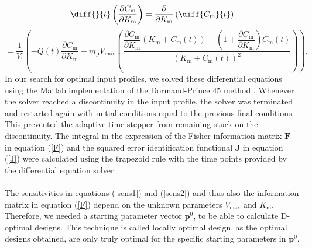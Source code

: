 \begin{equation}
\diff{}{t}\left(\dfrac{\partial C_\text{m}}{\partial K_{\text{m}}}\right) = 
\dfrac{\partial}{\partial K_{\text{m}}}\left(\diff{C_\text{m}}{t}\right)
\label{sens2}
\end{equation}
\begin{equation*}
=
\frac{ 1}{V_\text{j}} \left(-Q(t)\dfrac{\partial C_\text{m}}{\partial K_{\text{m}}} 
- m_\text{p}V_{\text{max}}\left(\frac{  \dfrac{\partial C_\text{m}}{\partial K_{\text{m}}}\left(K_\text{m} + C_\text{m}(t)\right) - \left(1 + \dfrac{\partial C_\text{m}}{\partial K_{\text{m}}}\right)C_\text{m}(t)}{(K_\text{m} + C_\text{m}(t))^2}
\right)\right).
\end{equation*}
In our search for optimal input profiles, we solved these differential equations using the Matlab implementation of the Dormand-Prince 45 method \parencite{matlab1}. Whenever the solver reached a discontinuity in the input profile, the solver was  terminated and restarted again with initial conditions equal to the previous final conditions. This prevent{ed} the adaptive time stepper from remaining stuck on the discontinuity. The integral in the expression of the Fisher information matrix $\mathbf{F}$ in equation (\ref{F}) and the squared error identification functional $\mathbf{J}$ in equation (\ref{J}) were  calculated using the trapezoid rule with the time points provided by the differential equation solver. 
\\
\\
The sensitivities in equations (\ref{sens1}) and (\ref{sens2}) and thus also the information matrix in equation (\ref{F}) depend on the unknown parameters $V_{\text{max}}$ and $K_{\text{m}}$. Therefore, we needed a starting parameter vector $\mathbf{p}^0$, to be able to calculate D-optimal designs. This technique is called locally optimal design, as the optimal designs obtained, are only truly optimal for the specific starting parameters in $\mathbf{p}^0$.
